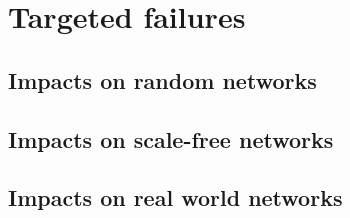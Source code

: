 \documentclass[
]{article}
\begin{document}
\hypertarget{targeted-failures}{%
\section{Targeted failures}\label{targeted-failures}}

\hypertarget{impacts-on-random-networks}{%
\subsection{Impacts on random
networks}\label{impacts-on-random-networks}}

\hypertarget{impacts-on-scale-free-networks}{%
\subsection{Impacts on scale-free
networks}\label{impacts-on-scale-free-networks}}

\hypertarget{impacts-on-real-world-networks}{%
\subsection{Impacts on real world
networks}\label{impacts-on-real-world-networks}}
\end{document}
